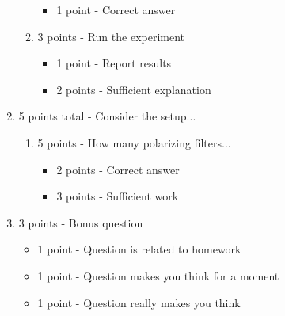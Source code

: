 \documentclass[12pt]{article}
\begin{document}
\begin{enumerate}[font=\bfseries]
\begin{enumerate}
\begin{itemize}
                \item 1 point - Correct answer
            \end{itemize}
            \item 3 points - Run the experiment
            \begin{itemize}
                \item 1 point - Report results
                \item 2 points - Sufficient explanation
            \end{itemize}
        \end{enumerate}
    \item 5 points total - Consider the setup...
        \begin{enumerate}
            \item 5 points - How many polarizing filters...
            \begin{itemize}
                \item 2 points - Correct answer
                \item 3 points - Sufficient work
            \end{itemize}
        \end{enumerate}
    \item 3 points - Bonus question
        \begin{itemize}
            \item 1 point - Question is related to homework
            \item 1 point - Question makes you think for a moment
            \item 1 point - Question really makes you think
        \end{itemize}
\end{enumerate}
\end{document}
